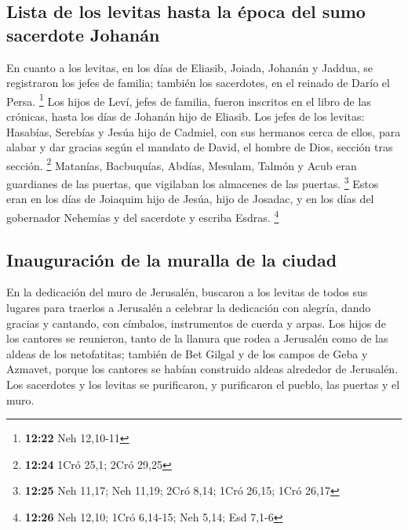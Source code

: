 \begin{paracol}{2}
\hypertarget{lista-de-los-levitas-hasta-la-uxe9poca-del-sumo-sacerdote-johanuxe1n}{%
\subsection{Lista de los levitas hasta la época del sumo sacerdote
Johanán}\label{lista-de-los-levitas-hasta-la-uxe9poca-del-sumo-sacerdote-johanuxe1n}}

 En cuanto a los levitas, en los días de Eliasib, Joiada,
Johanán y Jaddua, se registraron los jefes de familia; también los
sacerdotes, en el reinado de Darío el Persa. \footnote{\textbf{12:22}
  Neh 12,10-11}  Los hijos de Leví, jefes de familia,
fueron inscritos en el libro de las crónicas, hasta los días de Johanán
hijo de Eliasib.  Los jefes de los levitas: Hasabías,
Serebías y Jesúa hijo de Cadmiel, con sus hermanos cerca de ellos, para
alabar y dar gracias según el mandato de David, el hombre de Dios,
sección tras sección. \footnote{\textbf{12:24} 1Cró 25,1; 2Cró 29,25}
 Matanías, Bacbuquías, Abdías, Mesulam, Talmón y Acub
eran guardianes de las puertas, que vigilaban los almacenes de las
puertas. \footnote{\textbf{12:25} Neh 11,17; Neh 11,19; 2Cró 8,14; 1Cró
  26,15; 1Cró 26,17}  Estos eran en los días de Joiaquim
hijo de Jesúa, hijo de Josadac, y en los días del gobernador Nehemías y
del sacerdote y escriba Esdras. \footnote{\textbf{12:26} Neh 12,10; 1Cró
  6,14-15; Neh 5,14; Esd 7,1-6}

\hypertarget{inauguraciuxf3n-de-la-muralla-de-la-ciudad}{%
\subsection{Inauguración de la muralla de la
ciudad}\label{inauguraciuxf3n-de-la-muralla-de-la-ciudad}}

 En la dedicación del muro de Jerusalén, buscaron a los
levitas de todos sus lugares para traerlos a Jerusalén a celebrar la
dedicación con alegría, dando gracias y cantando, con címbalos,
instrumentos de cuerda y arpas.  Los hijos de los
cantores se reunieron, tanto de la llanura que rodea a Jerusalén como de
las aldeas de los netofatitas;  también de Bet Gilgal y
de los campos de Geba y Azmavet, porque los cantores se habían
construido aldeas alrededor de Jerusalén.  Los sacerdotes
y los levitas se purificaron, y purificaron el pueblo, las puertas y el
muro.


\end{paracol}
